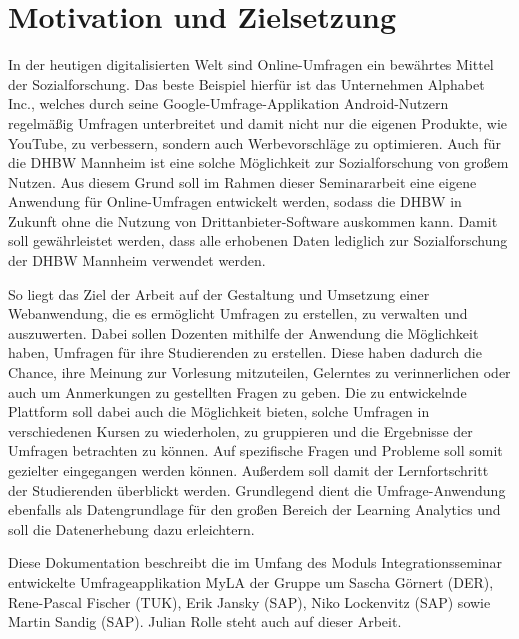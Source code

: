 \section{Motivation und Zielsetzung}

In der heutigen digitalisierten Welt sind Online-Umfragen ein bewährtes Mittel der Sozialforschung.
Das beste Beispiel hierfür ist das Unternehmen Alphabet Inc., welches durch seine Google-Umfrage-Applikation Android-Nutzern regelmäßig Umfragen unterbreitet und damit nicht nur die eigenen Produkte, wie YouTube, zu verbessern, sondern auch Werbevorschläge zu optimieren.
Auch für die \acs{DHBW} Mannheim ist eine solche Möglichkeit zur Sozialforschung von großem Nutzen.
Aus diesem Grund soll im Rahmen dieser Seminararbeit eine eigene Anwendung für Online-Umfragen entwickelt werden, sodass die \acs{DHBW} in Zukunft ohne die Nutzung von Drittanbieter-Software auskommen kann.
Damit soll gewährleistet werden, dass alle erhobenen Daten lediglich zur Sozialforschung der \acs{DHBW} Mannheim verwendet werden.

So liegt das Ziel der Arbeit auf der Gestaltung und Umsetzung einer Webanwendung, die es ermöglicht Umfragen zu erstellen, zu verwalten und auszuwerten.
Dabei sollen Dozenten mithilfe der Anwendung die Möglichkeit haben, Umfragen für ihre Studierenden zu erstellen.
Diese haben dadurch die Chance, ihre Meinung zur Vorlesung mitzuteilen, Gelerntes zu verinnerlichen oder auch um Anmerkungen zu gestellten Fragen zu geben.
Die zu entwickelnde Plattform soll dabei auch die Möglichkeit bieten, solche Umfragen in verschiedenen Kursen zu wiederholen, zu gruppieren und die Ergebnisse der Umfragen betrachten zu können.
Auf spezifische Fragen und Probleme soll somit gezielter eingegangen werden können.
Außerdem soll damit der Lernfortschritt der Studierenden überblickt werden.
Grundlegend dient die Umfrage-Anwendung ebenfalls als Datengrundlage für den großen Bereich der Learning Analytics und soll die Datenerhebung dazu erleichtern.


Diese Dokumentation beschreibt die im Umfang des Moduls Integrationsseminar entwickelte Umfrageapplikation MyLA der Gruppe um Sascha Görnert (DER), Rene-Pascal Fischer (TUK), Erik Jansky (SAP), Niko Lockenvitz (SAP) sowie Martin Sandig (SAP).
Julian Rolle steht auch auf dieser Arbeit.
